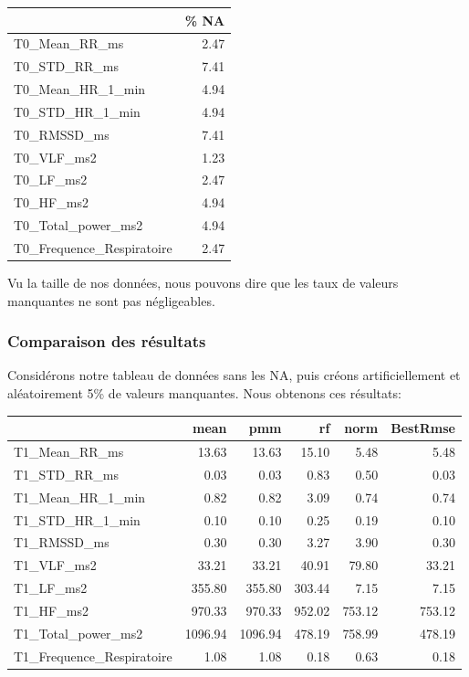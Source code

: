 \documentclass[]{article}
\begin{document}
\begin{table}[H]
\centering
\begin{tabular}{l|r}
\hline
  & \% NA\\
\hline
T0\_Mean\_RR\_ms & 2.47\\
\hline
T0\_STD\_RR\_ms & 7.41\\
\hline
T0\_Mean\_HR\_1\_min & 4.94\\
\hline
T0\_STD\_HR\_1\_min & 4.94\\
\hline
T0\_RMSSD\_ms & 7.41\\
\hline
T0\_VLF\_ms2 & 1.23\\
\hline
T0\_LF\_ms2 & 2.47\\
\hline
T0\_HF\_ms2 & 4.94\\
\hline
T0\_Total\_power\_ms2 & 4.94\\
\hline
T0\_Frequence\_Respiratoire & 2.47\\
\hline
\end{tabular}
\end{table}

Vu la taille de nos données, nous pouvons dire que les taux de valeurs
manquantes ne sont pas négligeables.

\hypertarget{comparaison-des-ruxe9sultats}{%
\subsubsection{Comparaison des
résultats}\label{comparaison-des-ruxe9sultats}}

Considérons notre tableau de données sans les NA, puis créons
artificiellement et aléatoirement 5\% de valeurs manquantes. Nous
obtenons ces résultats:

\begin{table}[H]
\centering
\begin{tabular}{l|r|r|r|r|r}
\hline
  & mean & pmm & rf & norm & BestRmse\\
\hline
T1\_Mean\_RR\_ms & 13.63 & 13.63 & 15.10 & 5.48 & 5.48\\
\hline
T1\_STD\_RR\_ms & 0.03 & 0.03 & 0.83 & 0.50 & 0.03\\
\hline
T1\_Mean\_HR\_1\_min & 0.82 & 0.82 & 3.09 & 0.74 & 0.74\\
\hline
T1\_STD\_HR\_1\_min & 0.10 & 0.10 & 0.25 & 0.19 & 0.10\\
\hline
T1\_RMSSD\_ms & 0.30 & 0.30 & 3.27 & 3.90 & 0.30\\
\hline
T1\_VLF\_ms2 & 33.21 & 33.21 & 40.91 & 79.80 & 33.21\\
\hline
T1\_LF\_ms2 & 355.80 & 355.80 & 303.44 & 7.15 & 7.15\\
\hline
T1\_HF\_ms2 & 970.33 & 970.33 & 952.02 & 753.12 & 753.12\\
\hline
T1\_Total\_power\_ms2 & 1096.94 & 1096.94 & 478.19 & 758.99 & 478.19\\
\hline
T1\_Frequence\_Respiratoire & 1.08 & 1.08 & 0.18 & 0.63 & 0.18\\
\hline
\end{tabular}
\end{table}
\end{document}
